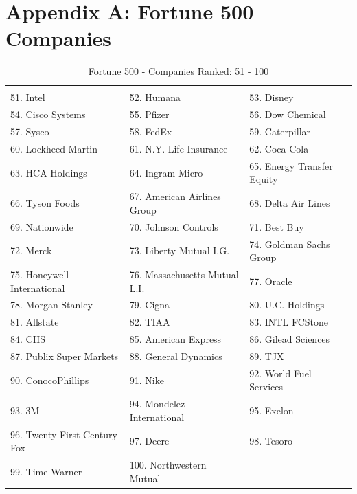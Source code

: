 \documentclass{article}
\begin{document}
\newpage
\appendix
\section{Appendix A: Fortune 500 Companies} \label{appA}
\begin{table}[H]
\centering
\caption{Fortune 500 - Companies Ranked: 51 - 100}
\begin{tabular}{lll}
\hline
 & & \\
51. Intel
& 52. Humana
& 53. Disney
 \\ 
 54. Cisco Systems
& 55. Pfizer
& 56. Dow Chemical
 \\ 
57. Sysco
& 58. FedEx
& 59. Caterpillar
 \\ 
60. Lockheed Martin
& 61. N.Y. Life Insurance
& 62. Coca-Cola
 \\ 
63. HCA Holdings
& 64. Ingram Micro
& 65. Energy Transfer Equity
 \\ 
66. Tyson Foods
& 67. American Airlines Group
& 68. Delta Air Lines
 \\ 
69. Nationwide
& 70. Johnson Controls
& 71. Best Buy
 \\ 
72. Merck
& 73. Liberty Mutual I.G.
& 74. Goldman Sachs Group
 \\ 
75. Honeywell International
& 76. Massachusetts Mutual L.I.
& 77. Oracle
 \\ 
78. Morgan Stanley
& 79. Cigna
& 80. U.C. Holdings
 \\ 
81. Allstate
& 82. TIAA
& 83. INTL FCStone
 \\ 
84. CHS
& 85. American Express
& 86. Gilead Sciences
 \\ 
87. Publix Super Markets
& 88. General Dynamics
& 89. TJX
 \\ 
90. ConocoPhillips
& 91. Nike
& 92. World Fuel Services
 \\ 
93. 3M
& 94. Mondelez International
& 95. Exelon
 \\ 
96. Twenty-First Century Fox
& 97. Deere
& 98. Tesoro
 \\ 
99. Time Warner
& 100. Northwestern Mutual
 &
 \\ \hline

\end{tabular}
\end{table}
\end{document}
